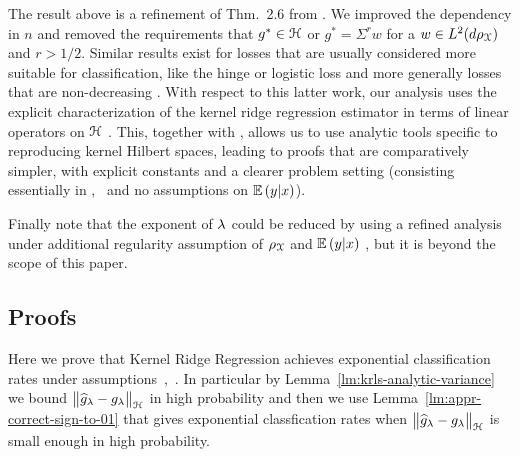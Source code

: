 The result above is a refinement of Thm.~2.6 from \citet{yao2007early}. We improved the dependency in $n$ and removed the requirements that $g^* \in \mathcal H$ or $g^* = \Sigma^{r}w$ for a $w \in L^2(d{\rho_{{\mathcal X}}})$ and $r > 1/2$. Similar results exist for losses that are usually considered more suitable for classification, like the hinge or logistic loss and more generally losses that are non-decreasing \citep[see][]{koltchinskii2005exponential}. With respect to this latter work, our analysis uses the explicit characterization of the kernel ridge regression estimator in terms of linear operators on $\mathcal H$ \citep[see][]{caponnetto2007optimal}. This, together with , allows us to use analytic tools specific to reproducing kernel Hilbert spaces, leading to proofs that are comparatively simpler, with explicit constants and a clearer problem setting (consisting essentially in ,~ and no assumptions on $\mathbb{E}\left({y}\middle|{x}\right)$). 

Finally note that the exponent of $\lambda$ could be reduced by using a refined analysis under additional regularity assumption of ${\rho_{{\mathcal X}}}$ and $\mathbb{E}\left({y}\middle|{x}\right)$ \citep[as {\em source condition} and {\em intrinsic dimension} from][]{caponnetto2007optimal}, but it is beyond the scope of this paper. 

\subsection{Proofs}

Here we prove that Kernel Ridge Regression achieves exponential classification rates under assumptions~,~. In particular by Lemma~\ref{lm:krls-analytic-variance} we bound $\bigl\|{\widehat{g}_\lambda - g_\lambda}\bigr\|_\mathcal H$ in high probability and then we use Lemma~\ref{lm:appr-correct-sign-to-01} that gives exponential classfication rates when $\bigl\|{\widehat{g}_\lambda - g_\lambda}\bigr\|_\mathcal H$ is small enough in high probability.

